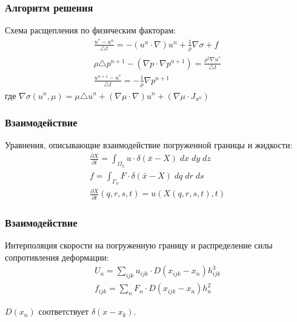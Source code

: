 \documentclass[14pt]{beamer}
\begin{document}
\begin{frame}
\frametitle{Алгоритм решения}
Схема расщепления по физическим факторам:
\begin{gather}
    \label{eq:split_first}
    \frac{u^* - u^n}{\triangle t} = - (u^n \cdot \nabla) u^n + \frac{1}{\rho} \nabla \sigma + f\\
    \label{eq:split_second}
    \rho \triangle p^{n+1} - (\nabla p \cdot \nabla p^{n+1}) = \frac{\rho^2 \nabla u^*}{\triangle t}\\
    \label{eq:split_third}
    \frac{u^{n+1} - u^*}{\triangle t} = - \frac{1}{\rho} \nabla p^{n+1}
\end{gather}
где $\nabla \sigma (u^n, \mu) = \mu \triangle u^n + (\nabla \mu \cdot \nabla) u^n + (\nabla \mu \cdot J_{u^n}) $
\end{frame}

\begin{frame}
\frametitle{Взаимодействие}
Уравнения, описывающие взаимодействие погруженной границы и жидкости:
\begin{gather}
    \label{eq:ibm_velocity}
    \frac{\partial X}{\partial t} = \int_{\Omega_h} u \cdot \delta (\bar{x} - X)\; dx\; dy\; dz \\
    \label{eq:ibm_force}
    f = \int_{\Gamma_h} F \cdot \delta (\bar{x} - X)\; dq\; dr\; ds\\
    \label{eq:no_slip}
    \frac{\partial X}{\partial t} (q, r, s, t) = u(X(q, r, s, t), t)
\end{gather}
\end{frame}

\begin{frame}
\frametitle{Взаимодействие}
Интерполяция скорости на погруженную границу и распределение силы сопротивления деформации:
\begin{gather}
    \label{eq:interpolation}
    U_n = \sum_{ijk}u_{ijk} \cdot D(x_{ijk} - x_n) h_{ijk}^3 \\
    \label{eq:spreading}
    f_{ijk} = \sum_n F_n \cdot D(x_{ijk} - x_n) h^2_n
\end{gather}

$D(x_n)$ соответствует $\delta(x - x_k)$.
\end{frame}
\end{document}
